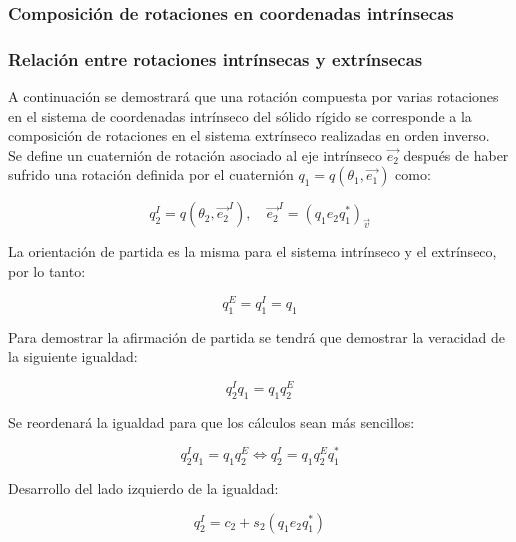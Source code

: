 \documentclass[10pt, a4paper]{report}
\begin{document}
\subsubsection{Composición de rotaciones en coordenadas intrínsecas}



\subsubsection{Relación entre rotaciones intrínsecas y extrínsecas}

A continuación se demostrará que una rotación compuesta por varias rotaciones en el sistema de coordenadas intrínseco del sólido rígido se corresponde a la composición de rotaciones en el sistema extrínseco realizadas en orden inverso.\\

Se define un cuaternión de rotación asociado al eje intrínseco $\vec{e_2}$ después de haber sufrido una rotación definida por el cuaternión $q_1 = q\left( \theta_1 , \vec{e_1} \right)$ como:

\begin{equation}
q_{2}^I = q\left(\theta_2 , \vec{e_2}^I \right) , \quad \vec{e_2}^I = (q_1e_2q_1^*)_{\vec{v}}
\end{equation}

La orientación de partida es la misma para el sistema intrínseco y el extrínseco, por lo tanto:

\begin{equation}
q_1^E = q_1^I = q_1
\end{equation}

Para demostrar la afirmación de partida se tendrá que demostrar la veracidad de la siguiente igualdad:

\begin{equation}
q_2^Iq_1 = q_1q_2^E
\end{equation}

Se reordenará la igualdad para que los cálculos sean más sencillos:

\begin{equation} \label{eq: E01}
q_2^Iq_1 = q_1q_2^E \iff q_2^I = q_1q_2^Eq_1^*
\end{equation}

Desarrollo del lado izquierdo de la igualdad:

\begin{equation} \label{eq: q_2I}
q_2^I = c_2 + s_2(q_1e_2q_1^*)
\end{equation}
\end{document}
